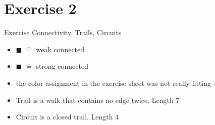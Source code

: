 
\section{Exercise 2}

\setcounter{exercise}{1}

\begin{frame}[allowframebreaks]{Exercise \thesection}{Connectivity, Trails, Circuits}
    \begin{exercisenoinc}
    \end{exercisenoinc}
    \begin{solution}
        \begin{itemize}
            \item \textcolor{SecondaryColor}{$\blacksquare$} $\hat=$ weak connected
            \item \textcolor{PrimaryColor}{$\blacksquare$} $\hat=$ strong connected
            \item the color assignment in the exercise sheet was not really fitting
        \end{itemize}
    \end{solution}
    \begin{exercisenoinc}
    \end{exercisenoinc}
    \begin{solutionnoinc}
        \begin{itemize}
            \item \alert{Trail} is a walk that contains no edge twice. Length $7$
        \end{itemize}
    \end{solutionnoinc}
    \begin{exercisenoinc}
    \end{exercisenoinc}
    \begin{solutionnoinc}
        \begin{itemize}
            \item \alert{Circuit} is a closed trail. Length $4$
        \end{itemize}
    \end{solutionnoinc}
\end{frame}
